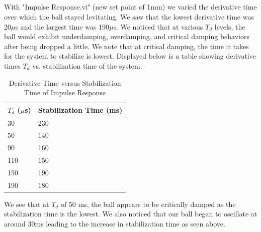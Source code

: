 \documentclass{article}
\begin{document}
\subsection{}
    With "Impulse Response.vi" (new set point of 1mm) we varied the derivative time over which the ball stayed levitating. We saw that the lowest derivative time was 20$\mu$s and the largest time was 190$\mu$s. We noticed that at various $T_d$ levels, the ball would exhibit underdamping, overdamping, and critical damping behaviors after being dropped a little. We note that at critical damping, the time it takes for the system to stabilize is lowest. Displayed below is a table showing derivative times $T_d$ vs. stabilization time of the system:
    \begin{table}[H]
        \centering
        \caption{Derivative Time versus Stabilization Time of Impulse Response}
        \label{my-label}
        \begin{tabular}{ll}
        \textbf{$T_d$ ($\mu$s)} & \textbf{Stabilization Time (ms)} \\ \hline
        30 & 230 \\
        50 & 140 \\
        90 & 160 \\
        110 & 150 \\
        150 & 190 \\
        190 & 180
        \end{tabular}
        \end{table}
    We see that at $T_d$ of 50 ms, the ball appears to be critically damped as the stabilization time is the lowest. We also noticed that our ball began to oscillate at around 30ms leading to the increase in stabilization time as seen above. 
\end{document}
